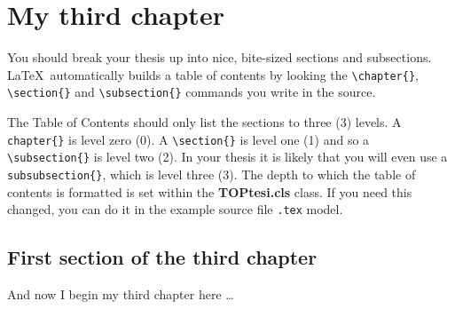 
\chapter{My third chapter}

    \graphicspath{{Chapter3/}}

You should break your thesis up into nice, bite-sized sections and subsections. \LaTeX\ automatically builds a table of contents by looking  the \verb|\chapter{}|, \verb|\section{}|  and \verb|\subsection{}| commands you write in the source.

The Table of Contents should only list the sections to three (3) levels. A \verb|chapter{}| is level zero (0). A \verb|\section{}| is level one (1) and so a \verb|\subsection{}| is level two (2). In your thesis it is likely that you will even use a \verb|subsubsection{}|, which is level three (3). The depth to which the table of contents is formatted is set within the \textbf{TOPtesi.cls} class. If you need this changed, you can do it in the example source file \texttt{\jobname.tex} model. 

\section{First section of the third chapter}
And now I begin my third chapter here \dots

\kant[1-3]


